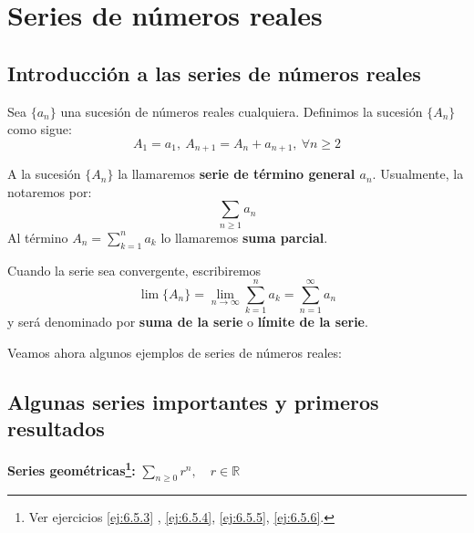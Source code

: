 \chapter{Series de números reales}\label{chp:Tema9}


\section{Introducción a las series de números reales}
\begin{definicion}
    Sea $\{a_n\}$ una sucesión de números reales cualquiera. Definimos la sucesión $\{A_n\}$ como sigue:
    \begin{equation*}
        A_1 = a_1, ~ A_{n+1} = A_n + a_{n+1}, ~\forall n \geq 2
    \end{equation*}
    
    A la sucesión $\{A_n\}$ la llamaremos \textbf{serie de término general $a_n$}. Usualmente, la notaremos por:
    \begin{equation*}
        \sum_{n \geq 1} a_n
    \end{equation*}
    Al término $A_n = \displaystyle\sum_{k = 1}^{n} a_k$ lo llamaremos \textbf{suma parcial}.

    Cuando la serie sea convergente, escribiremos
    \begin{equation*}
        \lim \{A_n\} = \lim_{n \to \infty} \displaystyle\sum_{k = 1}^{n} a_k = \sum_{n = 1}^{\infty} a_n 
    \end{equation*}
    y será denominado por \textbf{suma de la serie} o \textbf{límite de la serie}.

\end{definicion}

Veamos ahora algunos ejemplos de series de números reales:


%

\section{Algunas series importantes y primeros resultados}
\noindent\textbf{Series geométricas\footnote{ Ver ejercicios \ref{ej:6.5.3} , \ref{ej:6.5.4}, \ref{ej:6.5.5}, \ref{ej:6.5.6}.}:}
$\displaystyle \sum_{n \geq 0} r^n,\quad r \in \mathbb{R}$

